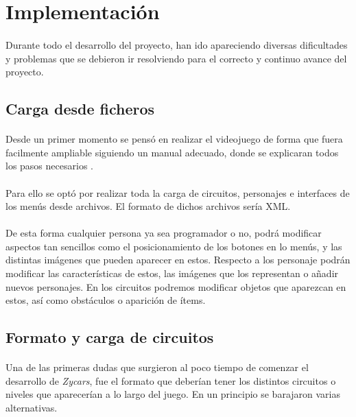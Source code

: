 \documentclass[a4paper,11pt]{article} %
\begin{document}
\section{Implementación}

\paragraph{}
Durante todo el desarrollo del proyecto, han ido apareciendo diversas dificultades y problemas que se debieron ir
resolviendo para el correcto y continuo avance del proyecto.

\subsection{Carga desde ficheros}

\paragraph{}
Desde un primer momento se pensó en realizar el videojuego de forma que fuera facilmente ampliable siguiendo un manual adecuado, 
donde se explicaran todos los pasos necesarios .

\paragraph{}
Para ello se optó por realizar toda la carga de circuitos, personajes e interfaces de los menús desde archivos. El formato de 
dichos archivos sería XML.

\paragraph{}
De esta forma cualquier persona ya sea programador o no, podrá modificar aspectos tan sencillos como el posicionamiento de los 
botones en lo menús, y las distintas imágenes que pueden aparecer en estos. Respecto a los personaje podrán modificar las 
características de estos, las imágenes que los representan o añadir nuevos personajes. En los circuitos podremos modificar objetos
que aparezcan en estos, así como obstáculos o aparición de ítems.

\subsection{Formato y carga de circuitos}

\paragraph{}
Una de las primeras dudas que surgieron al poco tiempo de comenzar el desarrollo de \emph{Zycars}, fue el formato que deberían
tener los distintos circuitos o niveles que aparecerían a lo largo del juego. En un principio se barajaron varias alternativas.
\end{document}
